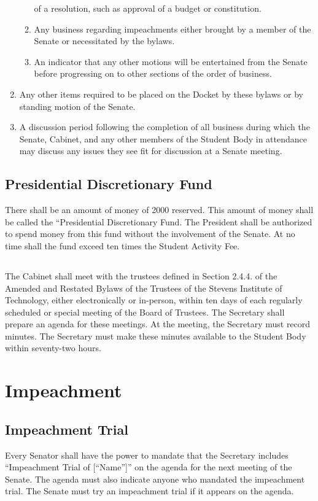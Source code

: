 \documentclass[12pt]{scrreprt}
\begin{document}
\begin{enumerate}
\begin{enumerate}
                  of a resolution, such as approval of a budget or 
                  constitution. 
            \item Any business regarding impeachments either brought by a 
                  member of the Senate or necessitated by the bylaws. 
            \item An indicator that any other motions will be entertained from 
                  the Senate before progressing on to other sections of the 
                  order of business. 
        \end{enumerate}
    \item Any other items required to be placed on the Docket by these bylaws 
          or by standing motion of the Senate.
    \item A discussion period following the completion of all business during which the Senate, Cabinet, and any other members of the Student Body in attendance may discuss any issues they see fit for discussion at a Senate meeting.
\end{enumerate}

\section{Presidential Discretionary Fund}
There shall be an amount of money of 2000 reserved. This amount of money shall be called the “Presidential Discretionary Fund. The President shall be authorized to spend money from this fund without the involvement of the Senate. At no time shall the fund exceed ten times the Student Activity Fee. 

\section{}
The Cabinet shall meet with the trustees defined in Section 2.4.4. of the Amended and Restated Bylaws of the Trustees of the Stevens Institute of Technology, either electronically or in-person, within ten days of each regularly scheduled or special meeting of the Board of Trustees. The Secretary shall prepare an agenda for these meetings. At the meeting, the Secretary must record minutes. The Secretary must make these minutes available to the Student Body within seventy-two hours.

\chapter{Impeachment}
\section{Impeachment Trial}
Every Senator shall have the power to mandate that the Secretary includes “Impeachment Trial of
[“Name”]” on the agenda for the next meeting of the Senate. The agenda must also indicate anyone who
mandated the impeachment trial. The Senate must try an impeachment trial if it appears on the agenda.
\end{document}
